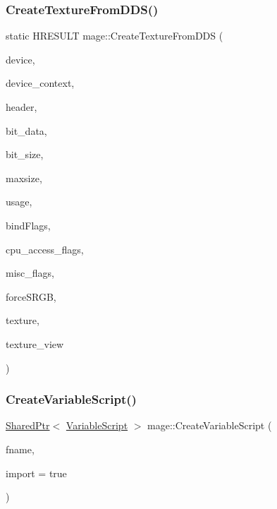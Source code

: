\subsubsection{\texorpdfstring{Create\+Texture\+From\+D\+D\+S()}{CreateTextureFromDDS()}}
{\footnotesize\ttfamily static H\+R\+E\+S\+U\+LT mage\+::\+Create\+Texture\+From\+D\+DS (\begin{DoxyParamCaption}\item[{\+\_\+\+In\+\_\+ I\+D3\+D11\+Device2 $\ast$}]{device,  }\item[{\+\_\+\+In\+\_\+opt\+\_\+ I\+D3\+D11\+Device\+Context $\ast$}]{device\+\_\+context,  }\item[{\+\_\+\+In\+\_\+ const \hyperlink{structmage_1_1_d_d_s___h_e_a_d_e_r}{D\+D\+S\+\_\+\+H\+E\+A\+D\+ER} $\ast$}]{header,  }\item[{\+\_\+\+In\+\_\+reads\+\_\+bytes\+\_\+(bit\+\_\+size) const uint8\+\_\+t $\ast$}]{bit\+\_\+data,  }\item[{\+\_\+\+In\+\_\+ size\+\_\+t}]{bit\+\_\+size,  }\item[{\+\_\+\+In\+\_\+ size\+\_\+t}]{maxsize,  }\item[{\+\_\+\+In\+\_\+ D3\+D11\+\_\+\+U\+S\+A\+GE}]{usage,  }\item[{\+\_\+\+In\+\_\+ uint32\+\_\+t}]{bind\+Flags,  }\item[{\+\_\+\+In\+\_\+ uint32\+\_\+t}]{cpu\+\_\+access\+\_\+flags,  }\item[{\+\_\+\+In\+\_\+ uint32\+\_\+t}]{misc\+\_\+flags,  }\item[{\+\_\+\+In\+\_\+ bool}]{force\+S\+R\+GB,  }\item[{\+\_\+\+Outptr\+\_\+opt\+\_\+ I\+D3\+D11\+Resource $\ast$$\ast$}]{texture,  }\item[{\+\_\+\+Outptr\+\_\+opt\+\_\+ I\+D3\+D11\+Shader\+Resource\+View $\ast$$\ast$}]{texture\+\_\+view }\end{DoxyParamCaption})\hspace{0.3cm}{\ttfamily [static]}}

\hypertarget{namespacemage_a4ee2d46e5220246892bb34b7d1e97fbe}{}\label{namespacemage_a4ee2d46e5220246892bb34b7d1e97fbe} 
\subsubsection{\texorpdfstring{Create\+Variable\+Script()}{CreateVariableScript()}}
{\footnotesize\ttfamily \hyperlink{namespacemage_a1e01ae66713838a7a67d30e44c67703e}{Shared\+Ptr}$<$ \hyperlink{classmage_1_1_variable_script}{Variable\+Script} $>$ mage\+::\+Create\+Variable\+Script (\begin{DoxyParamCaption}\item[{const wstring \&}]{fname,  }\item[{bool}]{import = {\ttfamily true} }\end{DoxyParamCaption})}

